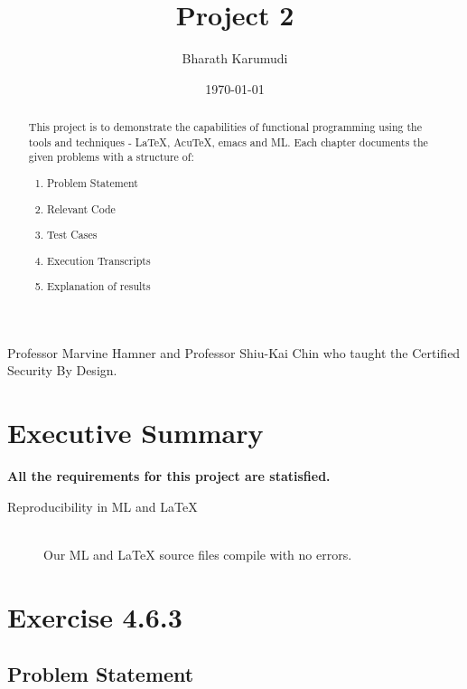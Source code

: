 \documentclass{report}
\title{Project 2}
\author{Bharath Karumudi}
\date{\today}
\begin{document}
 \lstset{language=ML}
 \maketitle{}

 \begin{abstract}
   This project is to demonstrate the capabilities of functional
   programming using the tools and techniques - \LaTeX{}, AcuTeX,
   emacs and ML. Each chapter documents the given problems with a
   structure of:
   \begin{enumerate}
   \item Problem Statement
   \item Relevant Code
   \item Test Cases
   \item Execution Transcripts
   \item Explanation of results
   \end{enumerate}

 \end{abstract}


 \begin{acknowledgments}
  Professor Marvine Hamner and Professor Shiu-Kai Chin who taught the
  Certified Security By Design.
 \end{acknowledgments}

 \tableofcontents{}

 \chapter{Executive Summary}
 \label{cha:executive-summary}

 \textbf{All the requirements for this project are statisfied.}


 \begin{description}
   \item[Reproducibility in ML and \LaTeX{}] \ \\
      Our ML and \LaTeX{} source files compile with no errors.
 \end{description}



 \chapter{Exercise 4.6.3}
 \label{cha:exercise-4.6.3}
  
 \section{Problem Statement}
 \label{sec:problem-statement-1}
\end{document}
